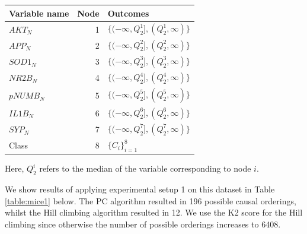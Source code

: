 \documentclass{tufte-book}
\begin{document}
\begin{center}
\begin{tabular}{l|r|l}
\hline
Variable name & Node & Outcomes\\
\hline
\(AKT_N\) & 1 & \(\{(-\infty, Q^1_2],(Q^1_2, \infty) \}\)\\
\(APP_N\) & 2 & \(\{(-\infty, Q^2_2],(Q^2_2, \infty) \}\)\\
\(SOD1_N\) & 3 & \(\{(-\infty, Q^3_2],(Q^3_2, \infty) \}\)\\
\(NR2B_N\) & 4 & \(\{(-\infty, Q^4_2],(Q^4_2, \infty) \}\)\\
\(pNUMB_N\) & 5 & \(\{(-\infty, Q^5_2],(Q^5_2, \infty) \}\)\\
\(IL1B_N\) & 6 & \(\{(-\infty, Q^6_2],(Q^6_2, \infty) \}\)\\
\(SYP_N\) & 7 & \(\{(-\infty, Q^7_2],(Q^7_2, \infty) \}\)\\
Class & 8 & \(\{C_i \}_{i=1}^8\)\\
\end{tabular}
\end{center}


Here, \(Q^i_2\) refers to the median of the variable corresponding to node \(i\).

We show results of applying experimental setup 1 on this dataset in Table \ref{table:mice1} below. The PC algorithm resulted in 196 possible causal orderings, whilst the Hill climbing algorithm resulted in 12. We use the K2 score \cite{carvalho-2009-scorin-bayes} for the Hill climbing since otherwise the number of possible orderings increases to 6408.
\end{document}
